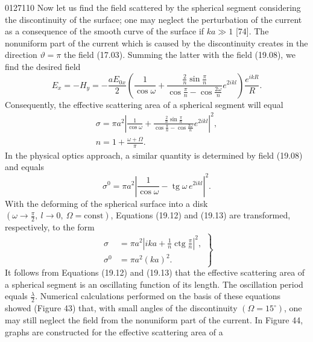 \begin{scanpage}{0127}{110}
Now let us find the field scattered by the spherical segment considering the discontinuity of the surface; one may neglect the perturbation of the current as a consequence of the smooth curve of the surface if $ka\gg1$ [74]. The nonuniform part of the current which is caused by the discontinuity creates in the direction $\vartheta=\pi$ the field (17.03). Summing the latter with the field (19.08), we find the desired field
\[E_x=-H_y=-\frac{aE_{0x}}2\left(\frac1{\cos\omega}+\frac{\frac2n\sin\frac\pi n}{\cos\frac\pi n-\cos\frac{2\omega}n}e^{2ikl}\right)\frac{e^{ikR}}R.\tag{19.11}\]
Consequently, the effective scattering area of a spherical segment will equal
\[\begin{gathered}\sigma=\pi a^2\left|\frac1{\cos\omega}+\frac{\frac2n\sin\frac\pi n}{\cos\frac\pi n-\cos\frac{2\omega}n}e^{2ikl}\right|^2,\\n=1+\frac{\omega+\Omega}\pi.
\end{gathered}\tag{19.12}\]
In the physical optics approach, a similar quantity is determined by field (19.08) and equals
\[\sigma^0=\pi a^2\left|\frac1{\cos\omega}-\operatorname{tg}\omega\,e^{2ikl}\right|^2.\tag{19.13}\]
With the deforming of the spherical surface into a disk $(\omega\to\frac\pi2,\ l\to0,\ \Omega=\mathrm{const})$, Equations (19.12) and (19.13) are transformed, respectively, to the form
\[\left.\begin{aligned}\sigma&=\pi a^2\left|ika+\frac1n\operatorname{ctg}\frac\pi n\right|^2,\\\sigma^0&=\pi a^2(ka)^2.\end{aligned}\right\}\tag{19.14}\]
It follows from Equations (19.12) and (19.13) that the effective scattering area of a spherical segment is an oscillating function of its length. The oscillation period equals $\frac\lambda2$. Numerical calculations performed on the basis of these equations showed (Figure 43) that, with small angles of the discontinuity $(\Omega=15^\circ)$, one may still neglect the field from the nonuniform part of the current. In Figure 44, graphs are constructed for the effective scattering area of a
\end{scanpage}
